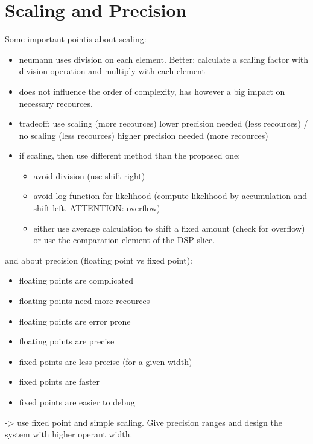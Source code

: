 \documentclass[paper=a4, fontsize=11pt]{scrartcl} %
\begin{document}
\section{Scaling and Precision}
Some important pointis about scaling:
\begin{itemize}
    \item neumann uses division on each element. Better: calculate
        a scaling factor with division operation and multiply with each element
    \item does not influence the order of complexity, has however a big
        impact on necessary recources.
    \item tradeoff: use scaling (more recources) lower precision needed (less recources)
        / no scaling (less recources) higher precision needed (more recources)
    \item if scaling, then use different method than the proposed one:
    \begin{itemize}
        \item avoid division (use shift right)
        \item avoid log function for likelihood (compute likelihood by accumulation and
            shift left. ATTENTION: overflow)
        \item either use average calculation to shift a fixed amount (check for overflow)
            or use the comparation element of the DSP slice.
    \end{itemize}
\end{itemize}

and about precision (floating point vs fixed point):
\begin{itemize}
    \item floating points are complicated
    \item floating points need more recources
    \item floating points are error prone
    \item floating points are precise
    \item fixed points are less precise (for a given width)
    \item fixed points are faster
    \item fixed points are easier to debug
\end{itemize}
-> use fixed point and simple scaling. Give precision ranges and design the system
with higher operant width.
\end{document}
